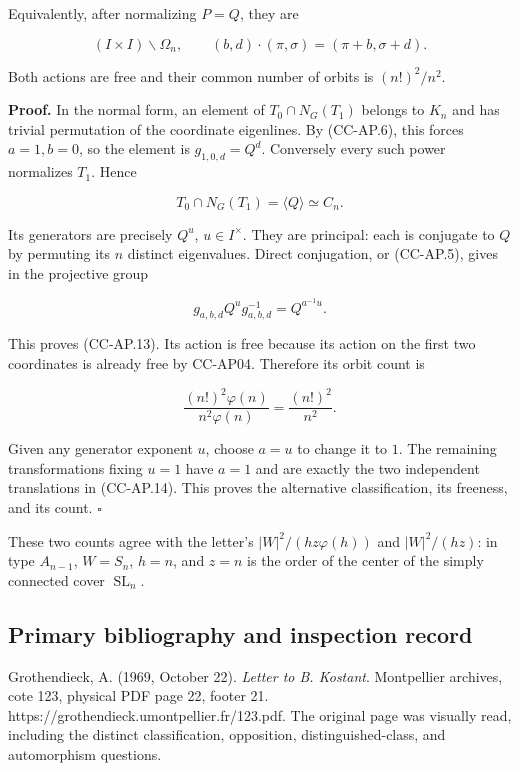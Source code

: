 Equivalently, after normalizing \(P=Q\), they are

\[
 (I\times I)\backslash\Omega_n,\qquad
 (b,d)\cdot(\pi,\sigma)=(\pi+b,\sigma+d).
 \tag{CC-AP.14}
\]

Both actions are free and their common number of orbits is
\((n!)^2/n^2\).

\textbf{Proof.} In the normal form, an element of \(T_0\cap N_G(T_1)\)
belongs to \(K_n\) and has trivial permutation of the coordinate
eigenlines. By (CC-AP.6), this forces \(a=1,b=0\), so the element is
\(g_{1,0,d}=Q^d\). Conversely every such power normalizes \(T_1\). Hence

\[
 T_0\cap N_G(T_1)=\langle Q\rangle\simeq C_n.
\]

Its generators are precisely \(Q^u\), \(u\in I^\times\). They are
principal: each is conjugate to \(Q\) by permuting its \(n\) distinct
eigenvalues. Direct conjugation, or (CC-AP.5), gives in the projective
group

\[
 g_{a,b,d}Q^u g_{a,b,d}^{-1}=Q^{a^{-1}u}.
\]

This proves (CC-AP.13). Its action is free because its action on the
first two coordinates is already free by CC-AP04. Therefore its orbit
count is

\[
 \frac{(n!)^2\varphi(n)}{n^2\varphi(n)}
 =\frac{(n!)^2}{n^2}.
\]

Given any generator exponent \(u\), choose \(a=u\) to change it to
\(1\). The remaining transformations fixing \(u=1\) have \(a=1\) and are
exactly the two independent translations in (CC-AP.14). This proves the
alternative classification, its freeness, and its count. \(\square\)

These two counts agree with the letter's \(|W|^2/(hz\varphi(h))\) and
\(|W|^2/(hz)\): in type \(A_{n-1}\), \(W=S_n\), \(h=n\), and \(z=n\) is
the order of the center of the simply connected cover
\(\operatorname{SL}_n\).

\subsection{Primary bibliography and inspection
record}\label{primary-bibliography-and-inspection-record}

Grothendieck, A. (1969, October 22). \emph{Letter to B. Kostant}.
Montpellier archives, cote 123, physical PDF page 22, footer 21.
https://grothendieck.umontpellier.fr/123.pdf. The original page was
visually read, including the distinct classification, opposition,
distinguished-class, and automorphism questions.

